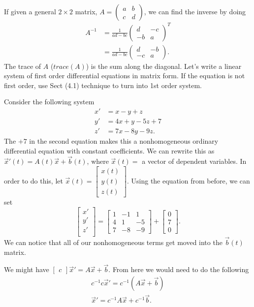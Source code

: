If given a general $2\times 2$ matrix, $A=\begin{pmatrix} a&b\\c&d \end{pmatrix} $, we can find the inverse by doing 
\begin{align*}
  A^{-1}&=\frac{1}{ad-bc}\begin{pmatrix} d&-c\\-b&a \end{pmatrix} ^{T}\\
        &=\frac{1}{ad-bc}\begin{pmatrix} d&-b\\-c&a \end{pmatrix} 
.\end{align*}
The trace of $A$ ($trace(A)$) is the sum along the diagonal.
\newline
Let's write a linear system of first order differential equations in matrix form. If the equation is not first order, use Sect (4.1) technique to turn into 1st order system.
\begin{eg}
  Consider the following system 
  \begin{align*}
    x'&=x-y+z\\
    y'&=4x+y-5z+7\\
    z'&=7x-8y-9z
  .\end{align*}
  The $+7$ in the second equation makes this a nonhomogeneous ordinary differential equation with constant coefficients. We can rewrite this as $\vec{x}'(t)=A(t)\vec{x}+\vec{b}(t)$, where $\vec{x}(t)=$ a vector of dependent variables. In order to do this, let $\vec{x}(t)=\begin{bmatrix} x(t)\\y(t)\\z(t) \end{bmatrix} $. Using the equation from before, we can set \[
  \begin{bmatrix} x'\\y'\\z'\\ \end{bmatrix} =\begin{bmatrix} 1&-1&1\\4&1&-5\\7&-8&-9 \end{bmatrix} +\begin{bmatrix} 0\\7\\0 \end{bmatrix} 
.\] We can notice that all of our nonhomogeneous terms get moved into the $\vec{b}(t)$ matrix.
\begin{note}
  We might have $\begin{bmatrix} c \end{bmatrix} \vec{x}'=A\vec{x}+\vec{b}$. From here we would need to do the following 
  \begin{align*}
    c^{-1}c\vec{x}'=c^{-1}(A\vec{x}+\vec{b})\\
    \vec{x}'=c^{-1}A\vec{x}+c^{-1}\vec{b}
  .\end{align*}
\end{note}
\end{eg}
